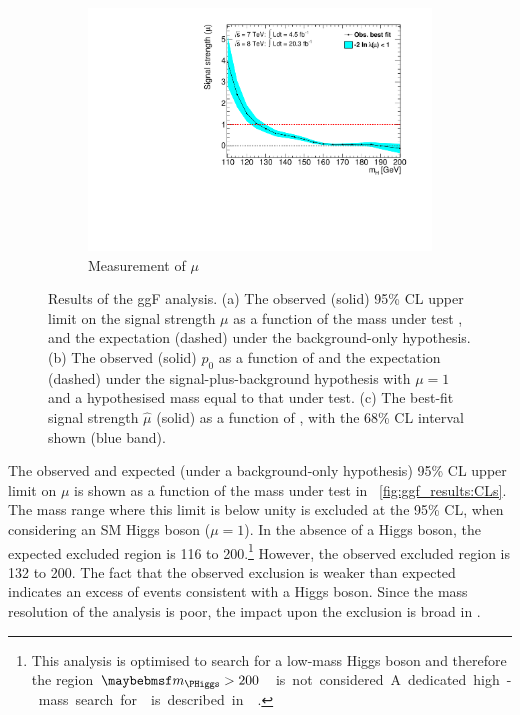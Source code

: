 \begin{figure}[p]
\begin{subfigure}[b]{0.495\textwidth}
		\includegraphics[width=\textwidth,clip=true,trim=0.6cm 0.8cm 1.0cm 0.4cm]{custom_images/limits/mu_ggf_only}
		\caption{Measurement of $\mu$}
		\label{fig:ggf_results:mu}
	\end{subfigure}
	\caption{Results of the ggF analysis. (a) The observed (solid) 95\% CL upper 
	limit on the signal strength $\mu$ as a function of the mass under test \mH, and the 
	expectation (dashed) under the background-only hypothesis. (b) The observed (solid) 
	$p_0$ as a function of \mH and the expectation (dashed) under the signal-plus-background 
	hypothesis with $\mu = 1$ and a hypothesised mass equal to that under test.	(c) The 
	best-fit signal strength $\hat{\mu}$ (solid) as a function of \mH, with the 68\% CL 
	interval shown (blue band).}
\end{figure}

The observed and expected (under a background-only hypothesis) 95\% CL upper limit on $\mu$ 
is shown as a function of the mass under test \mH in \Figure~\ref{fig:ggf_results:CLs}. The 
mass range where this limit is below unity is excluded at the 95\% CL, when considering an 
SM Higgs boson ($\mu = 1$). In the absence of a Higgs boson, the expected excluded region is 
\unit{116}{\GeV} to \unit{200}{\GeV}.\footnote{
	This analysis is optimised to search for a low-mass Higgs boson and therefore the region 
	\unit{$\mH > 200$}{\GeV} is not considered. A dedicated high-mass search for \HWW is 
	described in \Reference~\cite{HWW-highmass}.
}
However, the observed excluded region is \unit{132}{\GeV} to \unit{200}{\GeV}.
The fact that the observed exclusion is weaker than expected indicates an excess of 
events consistent with a Higgs boson. Since the mass resolution of the \HWW analysis is 
poor, the impact upon the exclusion is broad in \mH.

